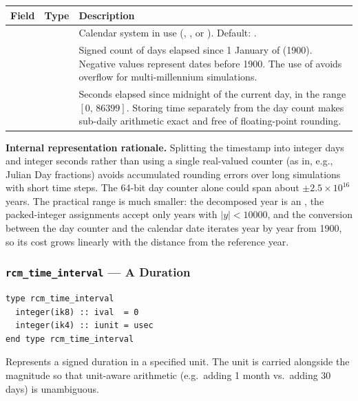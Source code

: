 \begin{longtable}{L{4cm} L{3cm} L{7cm}}
  \toprule
  \textbf{Field} & \textbf{Type} & \textbf{Description} \\
  \midrule
  \endhead
  \bottomrule
  \endfoot
              &  &
    Calendar system in use (, , or ).
    Default: . \\
   &  &
    Signed count of days elapsed since 1 January of 
    (1900). Negative values represent dates before 1900. The use of 
    avoids overflow for multi-millennium simulations. \\
        &  &
    Seconds elapsed since midnight of the current day, in the range
    $[0,\,86399]$. Storing time separately from the day count makes
    sub-daily arithmetic exact and free of floating-point rounding. \\
\end{longtable}

\textbf{Internal representation rationale.} Splitting the timestamp into
integer days and integer seconds rather than using a single real-valued
counter (as in, e.g., Julian Day fractions) avoids accumulated rounding errors
over long simulations with short time steps. The 64-bit day counter alone
could span about $\pm2.5\times10^{16}$ years. The practical range is much
smaller: the decomposed year is an , the packed-integer
assignments accept only years with $|y| < 10000$, and the conversion between
the day counter and the calendar date iterates year by year from 1900, so its
cost grows linearly with the distance from the reference year.

\subsubsection{\texttt{rcm\_time\_interval} --- A Duration}

\begin{lstlisting}
type rcm_time_interval
  integer(ik8) :: ival  = 0
  integer(ik4) :: iunit = usec
end type rcm_time_interval
\end{lstlisting}

Represents a signed duration in a specified unit. The unit is carried alongside
the magnitude so that unit-aware arithmetic (e.g.\ adding 1 month vs.\ adding
30 days) is unambiguous.

